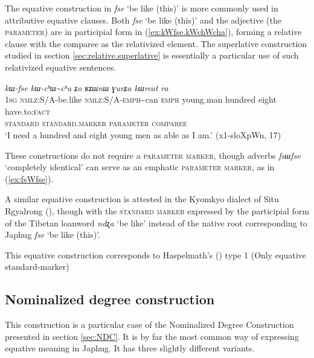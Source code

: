 \documentclass[oneside,a4paper,11pt]{article}
\newcommand{\ipa}[1]{{\phon\textit{#1}}}
\newcommand{\forme}[2]{\ipa{#1} `#2'}
\newcommand{\rdp}{\textasciitilde{}}
\begin{document}
The equative construction in \forme{fse}{be like (this)} is more commonly used in attributive equative clauses. Both \forme{fse}{be like (this)} and the adjective (the \textsc{parameter}) are in participial form in (\ref{ex:kWfse.kWchWcha}), forming a relative clause with the comparee as the relativized element. The superlative construction studied in section \ref{sec:relative.superlative} is essentially a particular use of such relativized equative sentences.

\begin{exe}
\ex \label{ex:kWfse.kWchWcha}
\glll \ipa{aʑo} 	\ipa{kɯ-fse} 	\ipa{kɯ-cʰɯ\rdp{}cʰa} 	\ipa{ʑo} 	\ipa{ʁʑɯnɯ} 	\ipa{ɣurʑa} 	\ipa{kɯrcat} 	\ipa{ra}  \\
\textsc{1sg} \textsc{nmlz}:S/A-be.like \textsc{nmlz}:S/A-\textsc{emph}\rdp{}can \textsc{emph} young.man hundred eight have.to:\textsc{fact} \\
\textsc{standard} \textsc{standard.marker} \textsc{parameter} { } \textsc{comparee} \\
\glt `I need a hundred and eight young men as able as I am.' (x1-sloXpWn, 17)
\end{exe}

These constructions do not require a \textsc{parameter marker}, though adverbs \forme{fsɯfse}{completely identical} can serve as an emphatic \textsc{parameter marker}, as in (\ref{ex:fsWfse}).

A similar equative construction is attested in the Kyomkyo dialect of Situ Rgyalrong (\citealt[238]{prins11kyomkyo}), though with the \textsc{standard marker} expressed by the participial form of the Tibetan loanword \forme{ndʐa}{be like} instead of the native root corresponding to Japhug \forme{fse}{be like (this)}.

This equative construction corresponds to Haspelmath's (\citeyear{haspelmath17equative}) type 1 (Only equative standard-marker)

\subsection{Nominalized degree construction} \label{sec:NDC.equative}
This construction is a particular case of the Nominalized Degree Construction presented in section \ref{sec:NDC}. It is by far the most common way of expressing equative meaning in Japhug. It has three slightly different variants. 
\end{document}
